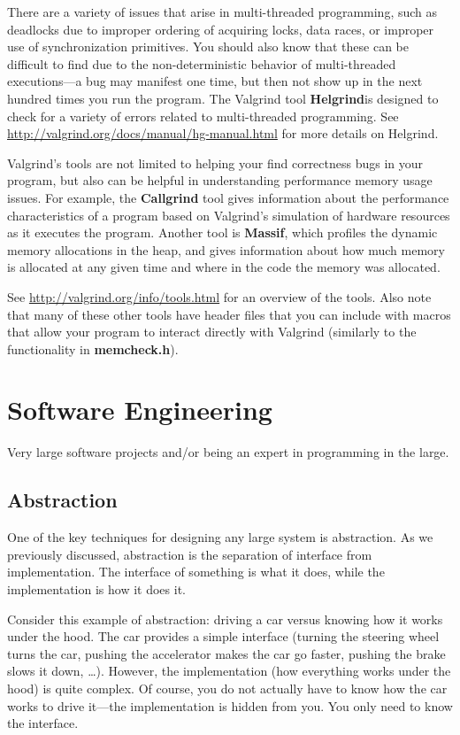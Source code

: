 \documentclass[11pt, a4paper]{article}
\begin{document}
There are a variety of issues that arise in multi-threaded programming, such as deadlocks due to improper ordering of acquiring locks, data races, or improper use of synchronization primitives. You should also know that these can be difficult to find due to the non-deterministic behavior of multi-threaded executions—a bug may manifest one time, but then not show up in the next hundred times you run the program. The Valgrind tool \textbf{Helgrind}is designed to check for a variety of errors related to multi-threaded programming. See \url{http://valgrind.org/docs/manual/hg-manual.html} for more details on Helgrind.

Valgrind’s tools are not limited to helping your find correctness bugs in your program, but also can be helpful in understanding performance memory usage issues. For example, the \textbf{Callgrind} tool gives information about the performance characteristics of a program based on Valgrind’s simulation of hardware resources as it executes the program. Another tool is \textbf{Massif}, which profiles the dynamic memory allocations in the heap, and gives information about how much memory is allocated at any given time and where in the code the memory was allocated.

See \url{http://valgrind.org/info/tools.html} for an overview of the tools. Also note that many of these other tools have header files that you can include with macros that allow your program to interact directly with Valgrind (similarly to the functionality in \textbf{memcheck.h}).




\section{Software Engineering}%
\label{sec:software_engineering}

Very large software projects and/or being an expert in programming in the large.


\subsection{Abstraction}%
\label{sub:abstraction}


One of the key techniques for designing any large system is abstraction. As we previously discussed, abstraction is the separation of interface from implementation. The interface of something is what it does, while the implementation is how it does it.

Consider this example of abstraction: driving a car versus knowing how it works under the hood. The car provides a simple interface (turning the steering wheel turns the car, pushing the accelerator makes the car go faster, pushing the brake slows it down, …). However, the implementation (how everything works under the hood) is quite complex. Of course, you do not actually have to know how the car works to drive it—the implementation is hidden from you. You only need to know the interface.
\end{document}

